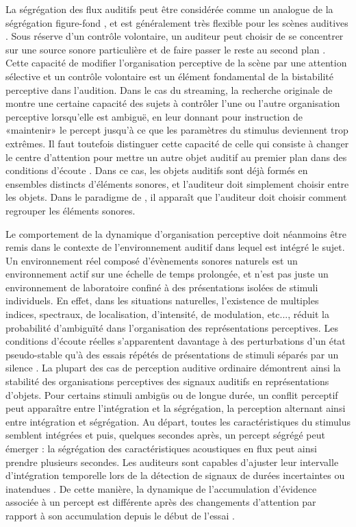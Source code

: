 La ségrégation des flux auditifs peut être considérée comme un analogue de la ségrégation figure-fond \citep{teki2011brain}, et est généralement très flexible pour les scènes auditives \citep{kleinschmidt2002human, knapen2011role, lumer1998neural, sterzer2007neural}. 
Sous réserve d'un contrôle volontaire, un auditeur peut choisir de se concentrer sur une source sonore particulière et de faire passer le reste au second plan \citep{steele2016buildup}. 
Cette capacité de modifier l'organisation perceptive de la scène par une attention sélective et un contrôle volontaire est un élément fondamental de la bistabilité perceptive dans l'audition. 
Dans le cas du streaming, la recherche originale de \cite{van1975temporal} montre une certaine capacité des sujets à contrôler l'une ou l'autre organisation perceptive lorsqu'elle est ambiguë, en leur donnant pour instruction de «maintenir» le percept jusqu'à ce que les paramètres du stimulus deviennent trop extrêmes. 
Il faut toutefois distinguer cette capacité de celle qui consiste à changer le centre d'attention pour mettre un autre objet auditif au premier plan dans des conditions d'écoute \citep{akram2014investigating, elhilali2009interaction}. 
Dans ce cas, les objets auditifs sont déjà formés en ensembles distincts d'éléments sonores, et l'auditeur doit simplement choisir entre les objets. 
Dans le paradigme de \cite{van1975temporal}, il apparaît que l'auditeur doit choisir comment regrouper les éléments sonores. 

Le comportement de la dynamique d'organisation perceptive doit néanmoins être remis dans le contexte de l'environnement auditif dans lequel est intégré le sujet. 
Un environnement réel composé d'évènements sonores naturels est un environnement actif sur une échelle de temps prolongée, et n'est pas juste un environnement de laboratoire confiné à des présentations isolées de stimuli individuels. 
En effet, dans les situations naturelles, l'existence de multiples indices, spectraux, de localisation, d'intensité, de modulation, etc..., réduit la probabilité d'ambiguïté dans l'organisation des représentations perceptives. 
Les conditions d'écoute réelles s'apparentent davantage à des perturbations d'un état pseudo-stable qu'à des essais répétés de présentations de stimuli séparés par un silence \citep{steele2016buildup}. 
La plupart des cas de perception auditive ordinaire démontrent ainsi la stabilité des organisations perceptives des signaux auditifs en représentations d'objets.
Pour certains stimuli ambigüs ou de longue durée, un conflit perceptif peut apparaître entre l'intégration et la ségrégation, la perception alternant ainsi entre intégration et ségrégation. 
Au départ, toutes les caractéristiques du stimulus semblent intégrées et puis, quelques secondes après, un percept ségrégé peut émerger : la ségrégation des caractéristiques acoustiques en flux peut ainsi prendre plusieurs secondes. 
Les auditeurs sont capables d'ajuster leur intervalle d'intégration temporelle lors de la détection de signaux de durées incertaintes ou inatendues \citep{dai1995detecting}. 
De cette manière, la dynamique de l'accumulation d'évidence associée à un percept est différente après des changements d'attention par rapport à son accumulation depuis le début de l'essai \citep{cusack2004effects}. 

